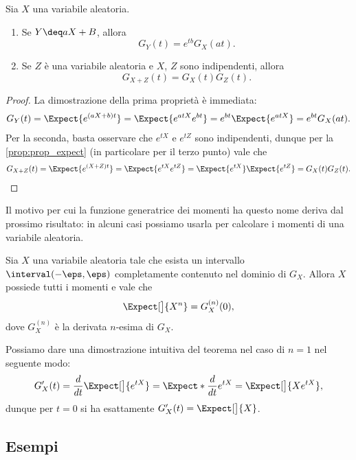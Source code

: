 \begin{proposition}
    Sia $X$ una variabile aleatoria.
    \begin{enumerate}[label={(\roman*)}]
        \item Se $Y \deq aX + B$, allora \[
            G_Y(t) = e^{tb} G_X(at).
        \]
        \item Se $Z$ è una variabile aleatoria e $X$, $Z$ sono indipendenti, allora \[
            G_{X + Z}(t) = G_X(t)G_Z(t).    
        \]
    \end{enumerate}
\end{proposition}
\begin{proof}
    La dimostrazione della prima proprietà è immediata: \begin{align*}
        G_Y(t)
        = \Expect{e^{(aX + b)t}}
        = \Expect{e^{atX}e^{bt}}
        = e^{bt}\Expect{e^{atX}}
        = e^{bt}G_X(at).
    \end{align*}
    Per la seconda, basta osservare che $e^{tX}$ e $e^{tZ}$ sono indipendenti, dunque per la \autoref{prop:prop_expect} (in particolare per il terzo punto) vale che \begin{align*}
        G_{X + Z}(t)
        = \Expect{e^{(X + Z)t}}
        = \Expect{e^{tX}e^{tZ}}
        = \Expect{e^{tX}}\Expect{e^{tZ}}
        = G_X(t)G_Z(t).
    \end{align*}
\end{proof}

Il motivo per cui la funzione generatrice dei momenti ha questo nome deriva dal prossimo risultato: in alcuni casi possiamo usarla per calcolare i momenti di una variabile aleatoria.

\begin{theorem}
     Sia $X$ una variabile aleatoria tale che esista un intervallo $\interval({-\eps, \eps})$ completamente contenuto nel dominio di $G_X$. Allora $X$ possiede tutti i momenti e vale che \[
        \Expect[\big]{X^n} = G_X^{(n)}(0),    
    \] dove $G_X^{(n)}$ è la derivata $n$-esima di $G_X$.
\end{theorem}

Possiamo dare una dimostrazione intuitiva del teorema nel caso di $n = 1$ nel seguente modo: \[
    G_X^\prime(t) = \frac{d}{dt}\Expect[\big]{e^{tX}} = 
    \Expect*{\frac{d}{dt}e^{tX}} = \Expect[\big]{Xe^{tX}},
\] dunque per $t = 0$ si ha esattamente $G_X^\prime(t) = \Expect[\big]{X}$.

\subsection*{Esempi}

